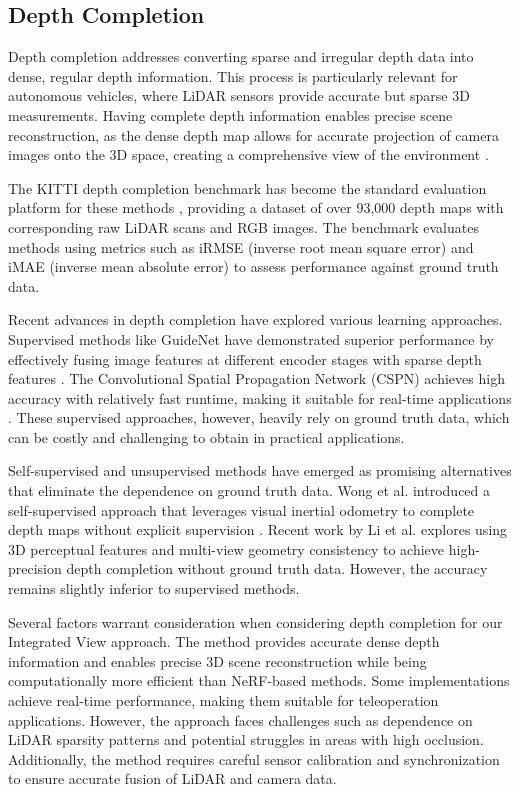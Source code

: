 \subsection{Depth Completion}

Depth completion addresses converting sparse and irregular depth data into dense, regular depth information. This process is particularly relevant for autonomous vehicles, where LiDAR sensors provide accurate but sparse 3D measurements. Having complete depth information enables precise scene reconstruction, as the dense depth map allows for accurate projection of camera images onto the 3D space, creating a comprehensive view of the environment \cite{tang2023comprehensive}.

The KITTI depth completion benchmark has become the standard evaluation platform for these methods \cite{uhrig2017sparsity}, providing a dataset of over 93,000 depth maps with corresponding raw LiDAR scans and RGB images. The benchmark evaluates methods using metrics such as iRMSE (inverse root mean square error) and iMAE (inverse mean absolute error) to assess performance against ground truth data.

Recent advances in depth completion have explored various learning approaches. Supervised methods like GuideNet have demonstrated superior performance by effectively fusing image features at different encoder stages with sparse depth features \cite{tang2023guidenet}. The Convolutional Spatial Propagation Network (CSPN) achieves high accuracy with relatively fast runtime, making it suitable for real-time applications \cite{cheng2020cspn}. These supervised approaches, however, heavily rely on ground truth data, which can be costly and challenging to obtain in practical applications.

Self-supervised and unsupervised methods have emerged as promising alternatives that eliminate the dependence on ground truth data. Wong et al. introduced a self-supervised approach that leverages visual inertial odometry to complete depth maps without explicit supervision \cite{wong2020unsupervised}. Recent work by Li et al. explores using 3D perceptual features and multi-view geometry consistency to achieve high-precision depth completion without ground truth data\cite{li2023self}. However, the accuracy remains slightly inferior to supervised methods.

Several factors warrant consideration when considering depth completion for our Integrated View approach. The method provides accurate dense depth information and enables precise 3D scene reconstruction while being computationally more efficient than NeRF-based methods. Some implementations achieve real-time performance, making them suitable for teleoperation applications. However, the approach faces challenges such as dependence on LiDAR sparsity patterns and potential struggles in areas with high occlusion. Additionally, the method requires careful sensor calibration and synchronization to ensure accurate fusion of LiDAR and camera data.

